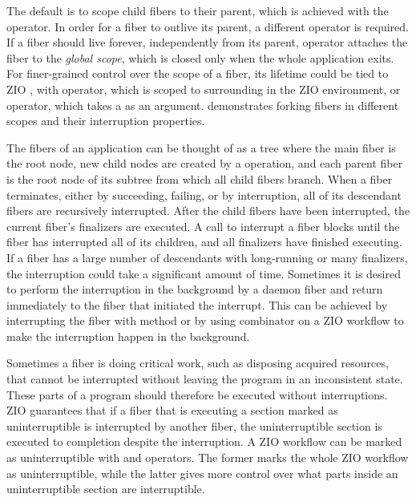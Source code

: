 

The default is to scope child fibers to their parent, which is achieved with the  operator. In order for a fiber to outlive its parent, a different operator is required. If a fiber should live forever, independently from its parent,  operator attaches the fiber to the \emph{global scope}, which is closed only when the whole application exits. For finer-grained control over the scope of a fiber, its lifetime could be tied to ZIO , with  operator, which is scoped to surrounding  in the ZIO environment, or  operator, which takes a  as an argument.  demonstrates forking fibers in different scopes and their interruption properties.



The fibers of an application can be thought of as a tree where the main fiber is the root node, new child nodes are created by a  operation, and each parent fiber is the root node of its subtree from which all child fibers branch. When a fiber terminates, either by succeeding, failing, or by interruption, all of its descendant fibers are recursively interrupted. After the child fibers have been interrupted, the current fiber's finalizers are executed. A call to interrupt a fiber blocks until the fiber has interrupted all of its children, and all finalizers have finished executing. If a fiber has a large number of descendants with long-running or many finalizers, the interruption could take a significant amount of time. Sometimes it is desired to perform the interruption in the background by a daemon fiber and return immediately to the fiber that initiated the interrupt. This can be achieved by interrupting the fiber with  method or by using  combinator on a ZIO workflow to make the interruption happen in the background.

Sometimes a fiber is doing critical work, such as disposing acquired resources, that cannot be interrupted without leaving the program in an inconsistent state. These parts of a program should therefore be executed without interruptions. ZIO guarantees that if a fiber that is executing a section marked as uninterruptible is interrupted by another fiber, the uninterruptible section is executed to completion despite the interruption. A ZIO workflow can be marked as uninterruptible with  and  operators. The former marks the whole ZIO workflow as uninterruptible, while the latter gives more control over what parts inside an uninterruptible section are interruptible.

